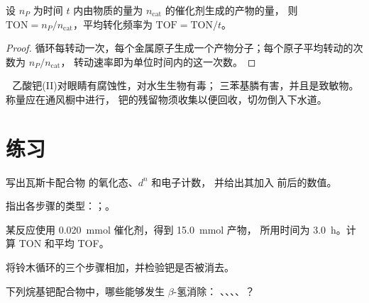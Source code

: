\begin{proposition}[转化数]\label{prop:b2:catalytic-cycles:tof}
设 $n_P$ 为时间 $t$ 内由物质的量为 $n_{\text{cat}}$ 的催化剂生成的产物的量，
则 $\mathrm{TON} = n_P/n_{\text{cat}}$，平均转化频率为 $\mathrm{TOF} =
\mathrm{TON}/t$。
\end{proposition}

\begin{proof}
循环每转动一次，每个金属原子生成一个产物分子；每个原子平均转动的次数为
$n_P/n_{\text{cat}}$，
转动速率即为单位时间内的这一次数。
\end{proof}

\begin{safety}{\,\,}
乙酸钯(II)对眼睛有腐蚀性，对水生生物有毒；
三苯基膦有害，并且是致敏物。称量应在通风橱中进行，
钯的残留物须收集以便回收，切勿倒入下水道。
\end{safety}

\section{练习}

\begin{exercise}[$\star$]\label{exo:b2:catalytic-cycles:1}
写出瓦斯卡配合物  的氧化态、$d^n$ 和电子计数，
并给出其加入  前后的数值。
\end{exercise}

\begin{exercise}[$\star$]\label{exo:b2:catalytic-cycles:2}
指出各步骤的类型：；。
\end{exercise}

\begin{exercise}[$\star$]\label{exo:b2:catalytic-cycles:3}
某反应使用 \qty{0.020}{mmol} 催化剂，得到 \qty{15.0}{mmol} 产物，
所用时间为 \qty{3.0}{h}。计算 TON 和平均 TOF。
\end{exercise}

\begin{exercise}[$\star$]\label{exo:b2:catalytic-cycles:4}
将铃木循环的三个步骤相加，并检验钯是否被消去。
\end{exercise}

\begin{exercise}[$\star\star$]\label{exo:b2:catalytic-cycles:5}
下列烷基钯配合物中，哪些能够发生 $\beta$-氢消除：
、、、、？
\end{exercise}

